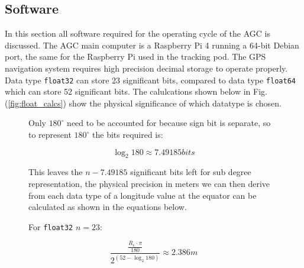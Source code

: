 \documentclass[11pt,landscape]{article}
\begin{document}
\newpage
\begin{multicols}{3}
\section{Software}
\label{software}
In this section all software required for the operating cycle of the AGC is
discussed. The AGC main computer is a Raspberry Pi 4 running a 64-bit Debian
port, the same for the Raspberry Pi used in the tracking pod. The GPS
navigation system requires high precision decimal storage to operate properly.
Data type \verb|float32| can store 23 significant bits, compared to data type
\verb|float64| which can store 52 significant
bits\cite{floating_point_goldberg}. The calulcations shown below in Fig.
(\ref{fig:float_calcs}) show the physical significance of which datatype is
chosen.
\begin{figure}[H]
    \begin{mdframed}
        Only $180^{\circ}$ need to be accounted for because sign bit is
        separate, so to represent $180^{\circ}$ the bits required is:
        \begin{center}
            \begin{equation*}
                \log_2{180} \approx 7.49185 bits
            \end{equation*}
        \end{center}
        This leaves the $n - 7.49185$ significant bits left for sub degree
        representation, the physical precision in meters we can then derive from
        each data type of a longitude value at the equator can be calculated as
        shown in the equations below.\newline
        \begin{center}
            \begin{minipage}{0.45\textwidth}
                \begin{mdframed}
                    For \verb|float32| $n=23$:
                    \begin{center}
                        \begin{equation*}
                            \frac{\frac{R_e \cdot \pi}{180}}{2^{\left(52 - \log_2{180}\right)}} \approx 2.386m
                            \label{eq}
                        \end{equation*}
                    \end{center}
                \end{mdframed}
                \end{minipage}

\end{center}
\end{mdframed}
\end{figure}
\end{multicols}
\end{document}
